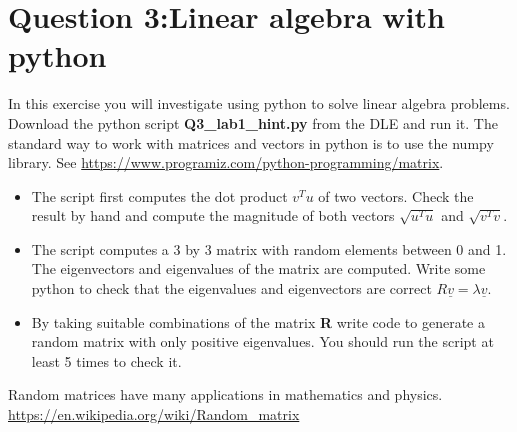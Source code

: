 \section*{Question 3:Linear algebra with python}

In this exercise you will investigate using 
python to solve linear algebra problems.
Download the python script
\textbf{Q3\_lab1\_hint.py}
from the DLE and run it.
The standard way to work with matrices and vectors
in python is to use the numpy library. See
\url{https://www.programiz.com/python-programming/matrix}.

\begin{itemize}

\item The script first computes the dot product $v^T u$ of two vectors. 
      Check the result by hand and compute the magnitude of 
      both vectors $\sqrt{u^T u} $ and $\sqrt{v^T v} $.


\item The script computes a 3 by 3 matrix with random elements between
  0 and 1. The eigenvectors and eigenvalues of the matrix are computed. 
  Write some python to check that the eigenvalues and eigenvectors are
  correct \textbf{$R \underline{v} = \lambda \underline{v} $}.


\item By taking suitable combinations of the matrix \textbf{R} write code to generate a
      random matrix with only positive eigenvalues. You should run the
      script at least 5 times to check it.

\end{itemize}

Random matrices have many applications in mathematics and physics.
\url{https://en.wikipedia.org/wiki/Random_matrix}

